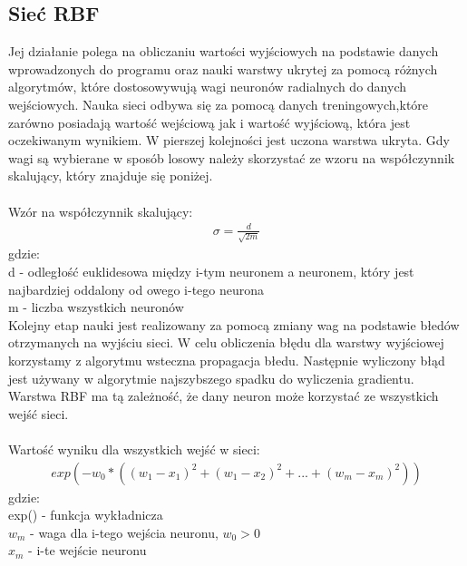 \documentclass{classrep}
\begin{document}
{        \subsection{Sieć RBF}
        {
            Jej działanie polega na obliczaniu wartości wyjściowych na podstawie danych
            wprowadzonych do programu oraz nauki warstwy ukrytej za pomocą różnych algorytmów,
            które dostosowywują wagi neuronów radialnych do danych wejściowych. Nauka sieci
            odbywa się za pomocą danych treningowych,które zarówno posiadają wartość wejściową
            jak i wartość wyjściową, która jest oczekiwanym wynikiem. W pierszej kolejności jest
            uczona warstwa ukryta. Gdy wagi są wybierane w sposób losowy należy skorzystać ze
            wzoru na współczynnik skalujący, który znajduje się poniżej.\\\\
            Wzór na współczynnik skalujący:
            \begin{align*}
                \sigma=\frac{d}{\sqrt{2m}}
            \end{align*}
            gdzie:\\
            d - odległość euklidesowa między i-tym neuronem a neuronem, który jest
            najbardziej oddalony od owego i-tego neurona\\
            m - liczba wszystkich neuronów\\

            Kolejny etap nauki jest realizowany za pomocą zmiany wag na podstawie błedów
            otrzymanych na wyjściu sieci. W celu obliczenia błędu dla warstwy wyjściowej
            korzystamy z algorytmu wsteczna propagacja błedu. Następnie wyliczony błąd jest
            używany w algorytmie najszybszego spadku do wyliczenia gradientu. Warstwa RBF
            ma tą zależność, że dany neuron może korzystać ze wszystkich wejść sieci.\\\\
            Wartość wyniku dla wszystkich wejść w sieci:
            \begin{align*}
                exp(-w_0*((w_1-x_1)^2+(w_1-x_2)^2+...+(w_m-x_m)^2))
            \end{align*}
            gdzie:\\
            exp() - funkcja wykładnicza\\
            $w_m$ - waga dla i-tego wejścia neuronu, $w_0>0$\\
            $x_m$ - i-te wejście neuronu\\
        }
    }
\end{document}
